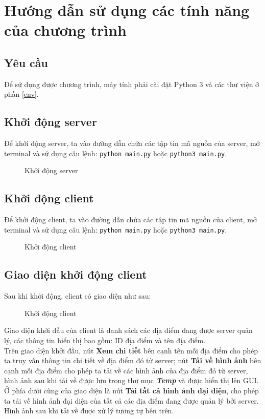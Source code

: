 \section{Hướng dẫn sử dụng các tính năng của chương trình}

\subsection{Yêu cầu}
Để sử dụng được chương trình, máy tính phải cài đặt Python 3 và các thư viện ở phần \ref{env}.

\subsection{Khởi động server}
Để khởi động server, ta vào đường dẫn chứa các tập tin mã nguồn của server, mở terminal và sử dụng câu lệnh: \lstinline[language=bash]{python main.py} hoặc \lstinline[language=bash]{python3 main.py}.
\begin{figure}[H]
\caption{Khởi động server}
\end{figure}

\subsection{Khởi động client}
Để khởi động client, ta vào đường dẫn chứa các tập tin mã nguồn của client, mở terminal và sử dụng câu lệnh: \lstinline[language=bash]{python main.py} hoặc \lstinline[language=bash]{python3 main.py}.
\begin{figure}[H]
\caption{Khởi động client}
\end{figure}

\subsection{Giao diện khởi động client}
Sau khi khởi động, client có giao diện như sau:
\begin{figure}[H]
\caption{Khởi động client}
\end{figure}
Giao diện khởi đầu của client là danh sách các địa điểm đang được server quản lý, các thông tin hiển thị bao gồm: ID địa điểm và tên địa điểm.\\
Trên giao diện khởi đầu, nút \textbf{Xem chi tiết} bên cạnh tên mỗi địa điểm cho phép ta truy vấn thông tin chi tiết về địa điểm đó từ server; nút \textbf{Tải về hình ảnh} bên cạnh mỗi địa điểm cho phép ta tải về các hình ảnh của địa điểm đó từ server, hình ảnh sau khi tải về được lưu trong thư mục \textbf{\textit{Temp}} và được hiển thị lên GUI.\\
Ở phía dưới cùng của giao diện là nút \textbf{Tải tất cả hình ảnh đại diện}, cho phép ta tải về hình ảnh đại diện của tất cả các địa điểm đang được quản lý bởi server. Hình ảnh sau khi tải về được xử lý tương tự bên trên.

